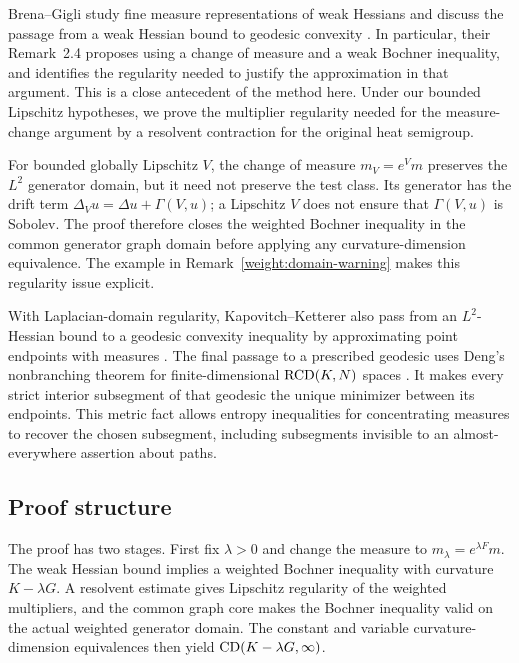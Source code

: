 Brena--Gigli study fine measure representations of weak Hessians
and discuss the passage from a weak Hessian bound to geodesic
convexity \cite[Remarks~2.3 and 2.4]{BrenaGigli2024}.
In particular, their Remark~2.4 proposes using a change of measure
and a weak Bochner inequality, and identifies the regularity needed
to justify the approximation in that argument. This is a close
antecedent of the method here. Under our bounded Lipschitz
hypotheses, we prove the multiplier regularity needed for the
measure-change argument by a resolvent contraction for the original
heat semigroup.

For bounded globally Lipschitz \(V\), the change of measure
\(m_V=e^V m\) preserves the \(L^2\) generator domain,
but it need not preserve the test class. Its generator has the drift term
\(\Delta_Vu=\Delta u+\Gamma(V,u)\); a Lipschitz \(V\) does not
ensure that \(\Gamma(V,u)\) is Sobolev. The proof therefore closes
the weighted Bochner inequality in the common generator graph
domain before applying any curvature-dimension equivalence.
The example in Remark~\ref{weight:domain-warning} makes this
regularity issue explicit.

With Laplacian-domain regularity, Kapovitch--Ketterer also pass
from an \(L^2\)-Hessian bound to a geodesic convexity inequality
by approximating point endpoints with measures
\cite[Theorem~4.7]{KapovitchKetterer2020}.
The final passage to a prescribed geodesic uses Deng's
nonbranching theorem for finite-dimensional \(\mathrm{RCD}(K,N)\) spaces
\cite[Theorem~1.3]{Deng2020}. It makes every strict interior
subsegment of that geodesic the unique minimizer between its
endpoints. This metric fact allows entropy inequalities for
concentrating measures to recover the chosen subsegment, including
subsegments invisible to an almost-everywhere assertion about paths.

\subsection{Proof structure}

The proof has two stages. First fix \(\lambda>0\) and change the
measure to \(m_\lambda=e^{\lambda F}m\). The weak Hessian bound
implies a weighted Bochner inequality with curvature
\(K-\lambda G\). A resolvent estimate gives Lipschitz regularity
of the weighted multipliers, and the common graph core makes the
Bochner inequality valid on the actual weighted generator domain.
The constant and variable curvature-dimension equivalences then
yield \(\mathrm{CD}(K-\lambda G,\infty)\).

